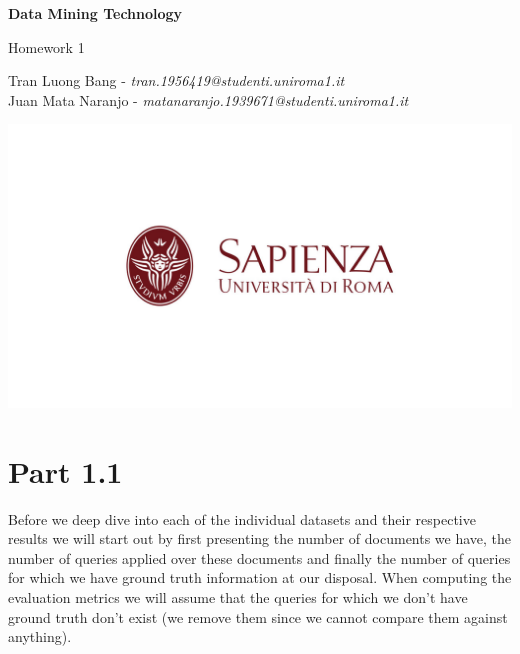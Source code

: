 \documentclass[10pt]{article}
\begin{document}
\begin{titlepage}
    \begin{center}
        \vspace*{3cm}
            
        \Huge
        \textbf{Data Mining Technology}
            
        \vspace{0.5cm}
        \LARGE
        Homework 1
            
        \vspace{1.5cm}
            
        Tran Luong Bang -  \textit{tran.1956419@studenti.uniroma1.it} \\ Juan Mata Naranjo - \textit{matanaranjo.1939671@studenti.uniroma1.it}
            
            
        \vspace{0.8cm}
            
        \includegraphics[width=1\textwidth]{sapienza.png}
            
    \end{center}
\end{titlepage}


\section{Part 1.1}

Before we deep dive into each of the individual datasets and their respective results we will start out by first presenting the number of documents we have, the number of queries applied over these documents and finally the number of queries for which we have ground truth information at our disposal. When computing the evaluation metrics we will assume that the queries for which we don't have ground truth don't exist (we remove them since we cannot compare them against anything).
\end{document}

